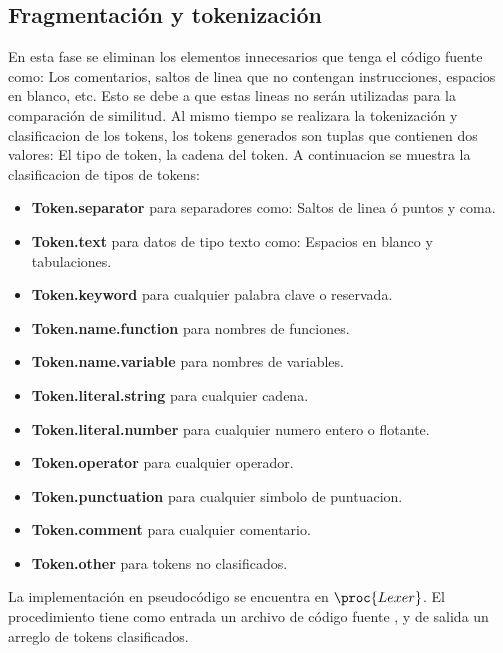 \subsection{Fragmentación y tokenización}
En esta fase se eliminan los elementos innecesarios que tenga el código fuente como: Los comentarios, saltos de linea que no contengan instrucciones, espacios en blanco, etc. Esto se debe a que estas lineas no serán utilizadas para la comparación de similitud. Al mismo tiempo se realizara la tokenización y clasificacion de los tokens, los tokens generados son tuplas que contienen dos valores: El tipo de token, la cadena del token. A continuacion se muestra la clasificacion de tipos de tokens:
\begin{itemize}
  \item \textbf{Token.separator} para separadores como: Saltos de linea ó puntos y coma.
  \item \textbf{Token.text} para datos de tipo texto como: Espacios en blanco y  tabulaciones.
  \item \textbf{Token.keyword} para cualquier palabra clave o reservada.
  \item \textbf{Token.name.function} para nombres de funciones.
  \item \textbf{Token.name.variable} para nombres de variables.
  \item \textbf{Token.literal.string} para cualquier cadena.
  \item \textbf{Token.literal.number} para cualquier numero entero o flotante.
  \item \textbf{Token.operator} para cualquier operador.
  \item \textbf{Token.punctuation} para cualquier simbolo de puntuacion.
  \item \textbf{Token.comment} para cualquier comentario.
  \item \textbf{Token.other} para tokens no clasificados.
\end{itemize}



La implementación en pseudocódigo se encuentra en $\proc{Lexer}$. El procedimiento tiene como entrada un archivo de código fuente , y de salida un arreglo de tokens clasificados.




